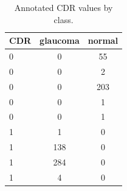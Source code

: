 \begin{table}[t]
\centering
\caption{Annotated CDR values by class.}
\label{tab:cdr}
\begin{tabular}{lcc}
\toprule
CDR & glaucoma & normal \\
\midrule
0 & 0 & 55 \\
0 & 0 & 2 \\
0 & 0 & 203 \\
0 & 0 & 1 \\
0 & 0 & 1 \\
1 & 1 & 0 \\
1 & 138 & 0 \\
1 & 284 & 0 \\
1 & 4 & 0 \\
\bottomrule
\end{tabular}
\end{table}